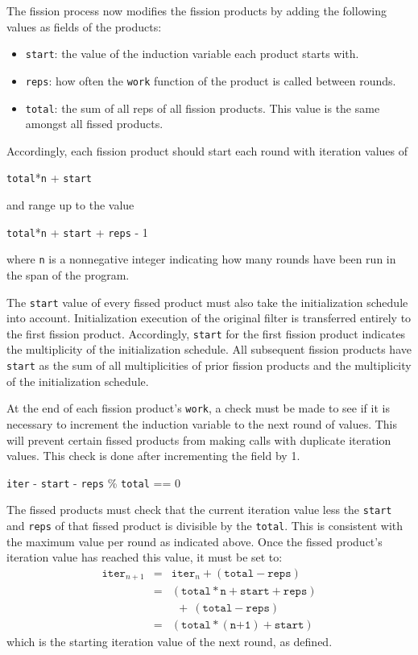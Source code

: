 The fission process now modifies the fission products by adding the
following values as fields of the products:
\begin{itemize}
    \item \texttt{start}: the value of the induction variable each product starts with.
    \item \texttt{reps}: how often the \texttt{work} function of the product is
      called between rounds.
    \item \texttt{total}: the sum of all reps of all fission products. This value is
      the same amongst all fissed products.
\end{itemize}
Accordingly, each fission product should start each round with iteration values
of
\begin{center}
\texttt{total}*\texttt{n} + \texttt{start}
\end{center}
and range up to the value
\begin{center}
\texttt{total}*\texttt{n} + \texttt{start} + \texttt{reps} - 1
\end{center}
where \texttt{n} is a nonnegative integer indicating how many rounds have
been run in the span of the program.  

The \texttt{start} value of every fissed product must also take the initialization schedule into account.  Initialization execution of the original filter is transferred entirely to the first fission product.  Accordingly, \texttt{start} for the first fission product indicates the multiplicity of the initialization schedule.  All subsequent fission products have \texttt{start} as the sum of all multiplicities of prior fission products and the multiplicity of the initialization schedule.

At the end of each fission product's \texttt{work}, a check must be made to see if it is necessary to increment the induction variable to the next round of values.  This will prevent certain fissed products from making calls with duplicate iteration values.  This check is done after incrementing the field by 1.
\begin{center}
\texttt{iter} - \texttt{start} - \texttt{reps} \% \texttt{total} == 0
\end{center}
The fissed products must check that the current iteration value less the
\texttt{start} and \texttt{reps} of that fissed product is divisible by the
\texttt{total}.  This is consistent with the maximum value per round as
indicated above.  Once the fissed product's iteration value has reached
this value, it must be set to:
\begin{eqnarray*}
\texttt{iter}_{n+1} &=& \texttt{iter}_{n} + (\texttt{total} - \texttt{reps}) \\
&=& (\texttt{total}*\texttt{n} + \texttt{start} + \texttt{reps}) \\
&&  \ \ +\ (\texttt{total} - \texttt{reps}) \\
&=& (\texttt{total}*(\texttt{n+1}) + \texttt{start})
\end{eqnarray*}
which is the starting iteration value of the next round, as defined.


